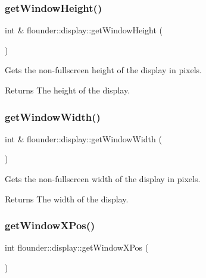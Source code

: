 \subsubsection{\texorpdfstring{get\+Window\+Height()}{getWindowHeight()}}
{\footnotesize\ttfamily int \& flounder\+::display\+::get\+Window\+Height (\begin{DoxyParamCaption}{ }\end{DoxyParamCaption})}



Gets the non-\/fullscreen height of the display in pixels. 

\begin{DoxyReturn}{Returns}
The height of the display. 
\end{DoxyReturn}
\mbox{\label{classflounder_1_1display_ac47027c6b34d260ccaf148e4e762cdbe}} 
\subsubsection{\texorpdfstring{get\+Window\+Width()}{getWindowWidth()}}
{\footnotesize\ttfamily int \& flounder\+::display\+::get\+Window\+Width (\begin{DoxyParamCaption}{ }\end{DoxyParamCaption})}



Gets the non-\/fullscreen width of the display in pixels. 

\begin{DoxyReturn}{Returns}
The width of the display. 
\end{DoxyReturn}
\mbox{\label{classflounder_1_1display_adbf55bdf135324664810751f3ab27d82}} 
\subsubsection{\texorpdfstring{get\+Window\+X\+Pos()}{getWindowXPos()}}
{\footnotesize\ttfamily int flounder\+::display\+::get\+Window\+X\+Pos (\begin{DoxyParamCaption}{ }\end{DoxyParamCaption})}



